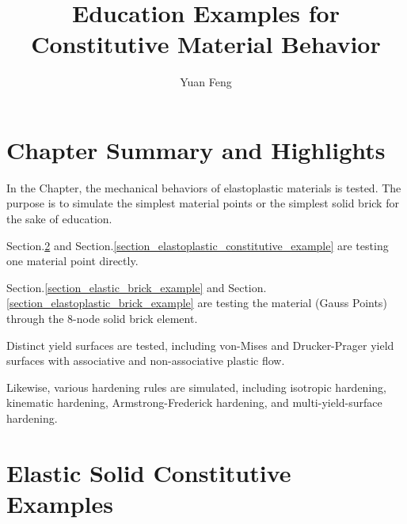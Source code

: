 \documentclass[fleqn,11pt]{article}
\title{Education Examples for Constitutive Material Behavior}
\author{Yuan Feng}
\begin{document}
\thispagestyle{fancy}
\maketitle
\tableofcontents

\newpage
\section{Chapter Summary and Highlights}

In the Chapter, the mechanical behaviors of elastoplastic materials
is tested. The purpose is to simulate the simplest material points
or the simplest solid brick for the sake of education. 

Section.\ref{section_elastic_constitutive_example} and 
Section.\ref{section_elastoplastic_constitutive_example} are testing
one material point directly. 

Section.\ref{section_elastic_brick_example} and 
Section.\ref{section_elastoplastic_brick_example} are testing the 
material (Gauss Points) through the 8-node solid brick element. 

Distinct yield surfaces are tested, including von-Mises and 
Drucker-Prager yield surfaces with associative and 
non-associative plastic flow. 

Likewise, various hardening rules are simulated, including 
isotropic hardening, kinematic hardening, 
Armstrong-Frederick hardening, and multi-yield-surface hardening.




\newpage
\section{Elastic Solid Constitutive Examples}
\label{section_elastic_constitutive_example}
\end{document}
